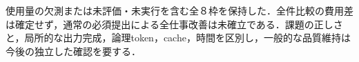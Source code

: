 使用量の欠測または未評価・未実行を含む全８枠を保持した．全件比較の費用差は確定せず，通常の必須提出による全仕事改善は未確立である．課題の正しさと，局所的な出力完成，論理token，cache，時間を区別し，一般的な品質維持は今後の独立した確認を要する．

